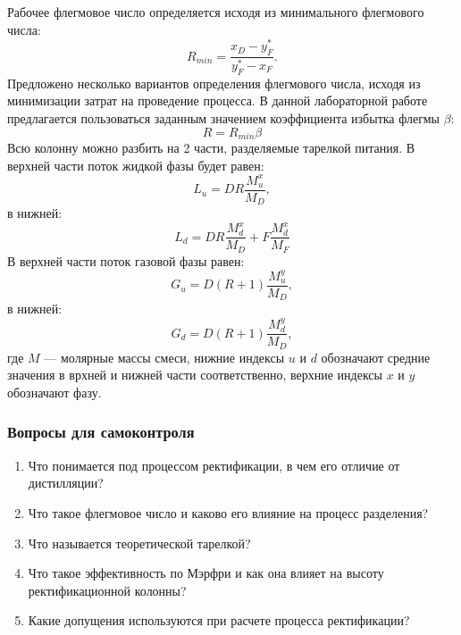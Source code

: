 Рабочее флегмовое число определяется исходя из минимального флегмового числа:
\begin{equation}
	R_{min}  = \dfrac{x_D - y^*_F}{y^*_F - x_F}.
\end{equation}
Предложено несколько вариантов определения флегмового числа, исходя из минимизации затрат на проведение процесса. В данной лабораторной работе предлагается пользоваться заданным значением коэффициента избытка флегмы $\beta$:
\begin{equation} 
	R = R_{min} \beta
\end{equation}
Всю колонну можно разбить на 2 части, разделяемые тарелкой питания. В верхней части поток жидкой фазы будет равен:
\begin{equation}
	L_{u} = D R \dfrac{M^x_u}{M_D},
\end{equation}
в нижней:
\begin{equation}
	L_{d} = DR \dfrac{M^x_d}{M_D} + F \dfrac{M^x_d}{M_F}
\end{equation}
В верхней части поток газовой фазы равен:
\begin{equation}
G_u = D(R+1)\dfrac{M^y_u}{M_D},
\end{equation}
в нижней:
\begin{equation}
G_d = D(R+1)\dfrac{M^y_d}{M_D},
\end{equation}
где $M$ --- молярные массы смеси, нижние индексы $u$ и $d$ обозначают средние значения в врхней и нижней части соответственно, верхние индексы $x$ и $y$ обозначают фазу.



\subsubsection*{Вопросы для самоконтроля}
\begin{enumerate}
\item Что понимается под процессом ректификации, в чем его отличие от дистилляции? 
\item Что такое флегмовое число и каково его влияние на процесс разделения?
\item Что называется теоретической тарелкой?
\item Что такое эффективность по Мэрфри и как она влияет на высоту ректификационной колонны?
\item Какие допущения используются при расчете процесса ректификации?
\end{enumerate}


